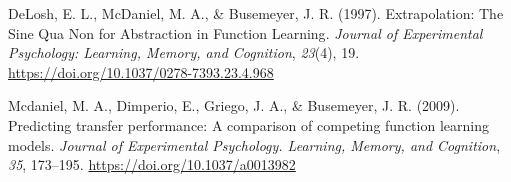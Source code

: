 \documentclass[
  letterpaper,
  DIV=11,
  numbers=noendperiod]{scrartcl}
\newlength{\cslhangindent}
\newenvironment{CSLReferences}[2] %
 {\begin{list}{}{%
  \setlength{\itemindent}{0pt}
  \setlength{\leftmargin}{0pt}
  \setlength{\parsep}{0pt}
  \ifodd #1
   \setlength{\leftmargin}{\cslhangindent}
   \setlength{\itemindent}{-1\cslhangindent}
  \fi
  \setlength{\itemsep}{#2\baselineskip}}}
 {\end{list}}
\begin{document}
\label{refs}
\begin{CSLReferences}{1}{0}
DeLosh, E. L., McDaniel, M. A., \& Busemeyer, J. R. (1997).
Extrapolation: {The Sine Qua Non} for {Abstraction} in {Function
Learning}. \emph{Journal of Experimental Psychology: Learning, Memory,
and Cognition}, \emph{23}(4), 19.
\url{https://doi.org/10.1037/0278-7393.23.4.968}

Mcdaniel, M. A., Dimperio, E., Griego, J. A., \& Busemeyer, J. R.
(2009). Predicting transfer performance: {A} comparison of competing
function learning models. \emph{Journal of Experimental Psychology.
Learning, Memory, and Cognition}, \emph{35}, 173--195.
\url{https://doi.org/10.1037/a0013982}

\end{CSLReferences}
\end{document}
